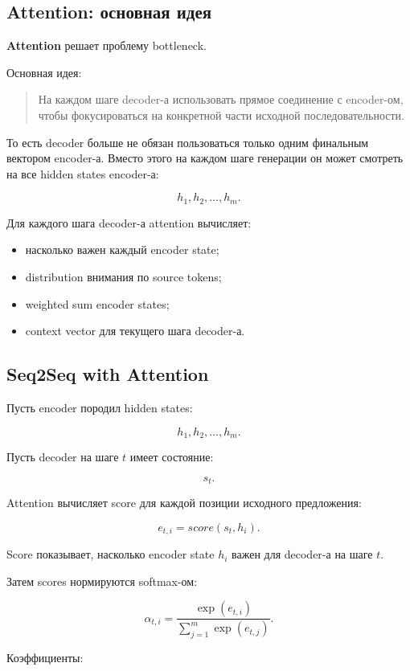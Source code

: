 \documentclass[a4paper,12pt]{article}
\begin{document}
\subsection{Attention: основная идея}

\textbf{Attention} решает проблему bottleneck.

Основная идея:

\begin{quote}
На каждом шаге decoder-а использовать прямое соединение с encoder-ом, чтобы фокусироваться на конкретной части исходной последовательности.
\end{quote}

То есть decoder больше не обязан пользоваться только одним финальным вектором encoder-а. Вместо этого на каждом шаге генерации он может смотреть на все hidden states encoder-а:

\[
h_1, h_2, \dots, h_m.
\]

Для каждого шага decoder-а attention вычисляет:

\begin{itemize}
    \item насколько важен каждый encoder state;
    \item distribution внимания по source tokens;
    \item weighted sum encoder states;
    \item context vector для текущего шага decoder-а.
\end{itemize}

\subsection{Seq2Seq with Attention}

Пусть encoder породил hidden states:

\[
h_1, h_2, \dots, h_m.
\]

Пусть decoder на шаге \(t\) имеет состояние:

\[
s_t.
\]

Attention вычисляет score для каждой позиции исходного предложения:

\[
e_{t,i}
=
score(s_t, h_i).
\]

Score показывает, насколько encoder state \(h_i\) важен для decoder-а на шаге \(t\).

Затем scores нормируются softmax-ом:

\[
\alpha_{t,i}
=
\frac{
\exp(e_{t,i})
}{
\sum_{j=1}^{m}
\exp(e_{t,j})
}.
\]

Коэффициенты:
\end{document}
